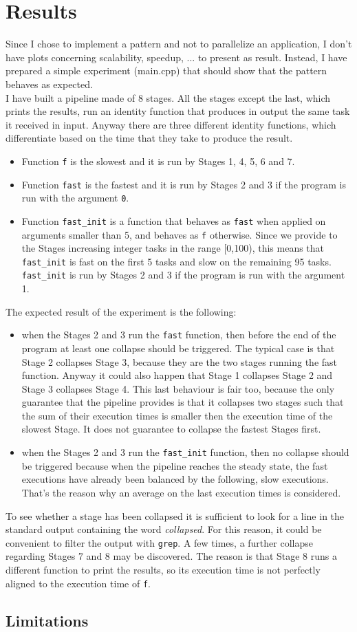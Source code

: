 \documentclass[12pt]{article}
\begin{document}
\section{Results}
Since I chose to implement a pattern and not to parallelize an application, I don't have plots concerning scalability, speedup, ... to present as result. Instead, I have prepared a simple  experiment (main.cpp) that should show that the pattern behaves as expected. \\
I have built a pipeline made of 8 stages. All the stages except the last, which prints the results,  run an identity function that produces in output the same task it received in input. Anyway there are three different identity functions, which differentiate based on the time that they take to produce the result. 
\begin{itemize}
\item Function \texttt{f} is the slowest and it is run by Stages 1, 4, 5, 6 and 7. 
\item Function \texttt{fast} is the fastest and it is run by Stages 2 and 3 if the program is run with the argument \texttt{0}. 
\item Function \texttt{fast\_init} is a function that behaves as \texttt{fast} when applied on arguments smaller than 5, and behaves as \texttt{f} otherwise. Since we provide to the Stages increasing integer tasks in the range [0,100), this means that \texttt{fast\_init} is fast on the first 5 tasks and slow on the remaining 95 tasks. \texttt{fast\_init} is run by Stages 2 and 3 if the program is run with the argument 1. 
\end{itemize}
The expected result of the experiment is the following: 
\begin{itemize}
\item when the Stages 2 and 3 run the \texttt{fast} function, then before the end of the program at least one collapse should be triggered. The typical case is that Stage 2 collapses Stage 3, because they are the two stages running the fast function. Anyway it could also happen that Stage 1 collapses Stage 2 and Stage 3 collapses Stage 4. This last behaviour is fair too, because the only guarantee that the pipeline provides is that it collapses two stages such that the sum of their execution times is smaller then the execution time of the slowest Stage. It does not guarantee to collapse the fastest Stages first.
\item when the Stages 2 and 3 run the \texttt{fast\_init} function, then no collapse should be triggered because when the pipeline reaches the steady state, the fast executions have already been balanced by the following, slow executions. That's the reason why an average on the last execution times is considered.
\end{itemize}
To see whether a stage has been collapsed it is sufficient to look for a line in the standard output containing the word \textit{collapsed}. For this reason, it could be convenient to filter the output with \texttt{grep}. A few times, a further collapse regarding Stages 7 and 8 may be discovered. The reason is that Stage 8 runs a different function to print the results, so its execution time is not perfectly aligned to the execution time of \texttt{f}.   

\subsection{Limitations}
\end{document}
